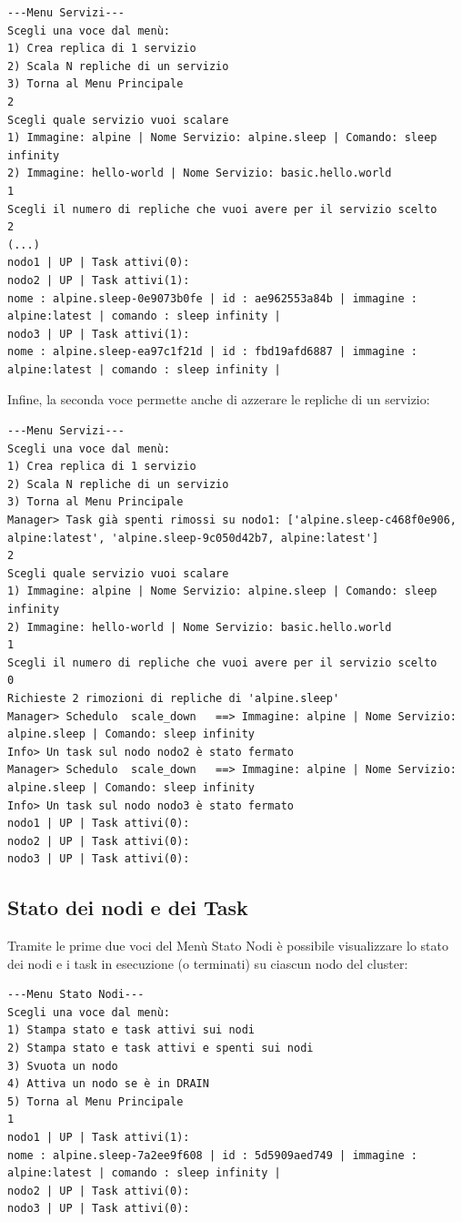 \documentclass[12pt,a4paper]{article}
\begin{document}
\begin{verbatim}
---Menu Servizi---
Scegli una voce dal menù:
1) Crea replica di 1 servizio
2) Scala N repliche di un servizio
3) Torna al Menu Principale
2
Scegli quale servizio vuoi scalare
1) Immagine: alpine | Nome Servizio: alpine.sleep | Comando: sleep infinity
2) Immagine: hello-world | Nome Servizio: basic.hello.world
1
Scegli il numero di repliche che vuoi avere per il servizio scelto
2
(...)
nodo1 | UP | Task attivi(0): 
nodo2 | UP | Task attivi(1): 
nome : alpine.sleep-0e9073b0fe | id : ae962553a84b | immagine : alpine:latest | comando : sleep infinity | 
nodo3 | UP | Task attivi(1): 
nome : alpine.sleep-ea97c1f21d | id : fbd19afd6887 | immagine : alpine:latest | comando : sleep infinity | 
\end{verbatim}
Infine, la seconda voce permette anche di azzerare le repliche di un servizio:
\begin{verbatim}
---Menu Servizi---
Scegli una voce dal menù:
1) Crea replica di 1 servizio
2) Scala N repliche di un servizio
3) Torna al Menu Principale
Manager> Task già spenti rimossi su nodo1: ['alpine.sleep-c468f0e906, alpine:latest', 'alpine.sleep-9c050d42b7, alpine:latest']
2
Scegli quale servizio vuoi scalare
1) Immagine: alpine | Nome Servizio: alpine.sleep | Comando: sleep infinity
2) Immagine: hello-world | Nome Servizio: basic.hello.world
1
Scegli il numero di repliche che vuoi avere per il servizio scelto
0
Richieste 2 rimozioni di repliche di 'alpine.sleep'
Manager> Schedulo  scale_down   ==> Immagine: alpine | Nome Servizio: alpine.sleep | Comando: sleep infinity
Info> Un task sul nodo nodo2 è stato fermato
Manager> Schedulo  scale_down   ==> Immagine: alpine | Nome Servizio: alpine.sleep | Comando: sleep infinity
Info> Un task sul nodo nodo3 è stato fermato
nodo1 | UP | Task attivi(0): 
nodo2 | UP | Task attivi(0): 
nodo3 | UP | Task attivi(0): 
\end{verbatim}
\newpage
\subsection{Stato dei nodi e dei Task}
Tramite le prime due voci del Menù Stato Nodi è possibile visualizzare lo stato dei nodi e i task in esecuzione (o terminati) su ciascun nodo del cluster: 
\begin{verbatim}
---Menu Stato Nodi---
Scegli una voce dal menù:
1) Stampa stato e task attivi sui nodi
2) Stampa stato e task attivi e spenti sui nodi
3) Svuota un nodo 
4) Attiva un nodo se è in DRAIN 
5) Torna al Menu Principale
1
nodo1 | UP | Task attivi(1): 
nome : alpine.sleep-7a2ee9f608 | id : 5d5909aed749 | immagine : alpine:latest | comando : sleep infinity | 
nodo2 | UP | Task attivi(0): 
nodo3 | UP | Task attivi(0): 
\end{verbatim}
\end{document}
